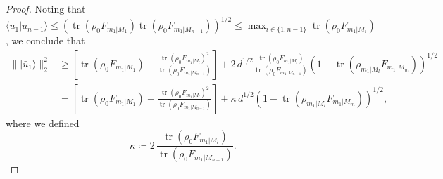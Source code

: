 \begin{proof}
Noting that $\langle u_1 \vert u_{n-1} \rangle \leq \left(\operatorname{tr}(\rho_0F_{m_1\vert M_1})\operatorname{tr}(\rho_0F_{m_1\vert M_{n-1}})\right)^{1/2}\leq \max_{i\in \{1,n-1\}} \operatorname{tr}(\rho_0 F_{m_1\vert M_i})$, we conclude that 
\[\begin{split} \|\vert \bar{u}_1 \rangle \|_2^2  & \geq \left[\operatorname{tr}(\rho_0 F_{m_1\vert M_1})-\frac{\operatorname{tr}(\rho_0 F_{m_1\vert M_l})^2}{\operatorname{tr}(\rho_0 F_{m_1\vert M_{n-1}})}\right]+ 2\,d^{1/2}\frac{\operatorname{tr}(\rho_0 F_{m_1\vert M_l})}{\operatorname{tr}(\rho_0 F_{m_1\vert M_{n-1}})}\left(1-\operatorname{tr}(\rho_{m_1\vert M_l} F_{m_1\vert M_m})\right)^{1/2} \\[1em]
& = \left[\operatorname{tr}(\rho_0 F_{m_1\vert M_1})-\frac{\operatorname{tr}(\rho_0 F_{m_1\vert M_l})^2}{\operatorname{tr}(\rho_0 F_{m_1\vert M_{n-1}})}\right]+\kappa\, d^{1/2}\left(1-\operatorname{tr}(\rho_{m_1\vert M_l} F_{m_1\vert M_m})\right)^{1/2}, \end{split}\]
where we defined \[\kappa\coloneqq 2\,\frac{\operatorname{tr}(\rho_0 F_{m_1\vert M_l})}{\operatorname{tr}(\rho_0 F_{m_1\vert M_{n-1}})}.\]


\end{proof}

